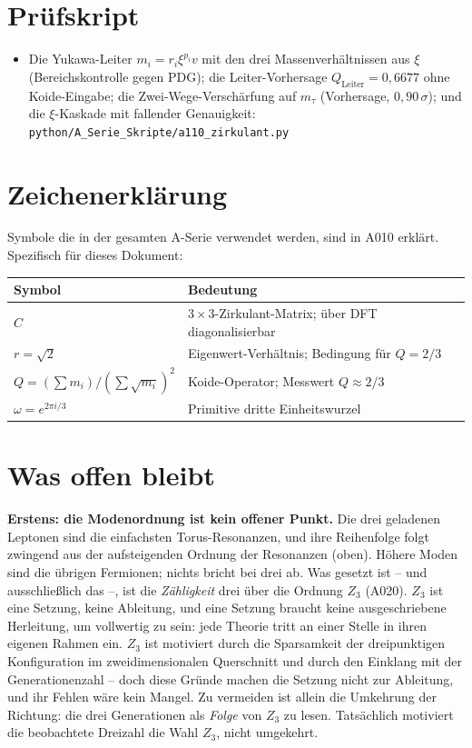 \section{Prüfskript}

\begin{itemize}
  \item Die Yukawa-Leiter $m_i = r_i\xi^{p_i}v$ mit den drei Massenverhältnissen
    aus $\xi$ (Bereichskontrolle gegen PDG); die Leiter-Vorhersage
    $Q_\text{Leiter}=0{,}6677$ ohne Koide-Eingabe; die Zwei-Wege-Verschärfung auf
    $m_\tau$ (Vorhersage, $0{,}90\,\sigma$); und die $\xi$-Kaskade mit fallender
    Genauigkeit:
    \texttt{python/A\_Serie\_Skripte/a110\_zirkulant.py}
\end{itemize}


\section{Zeichenerklärung}

Symbole die in der gesamten A-Serie verwendet werden, sind in A010 erklärt.
Spezifisch für dieses Dokument:

\begin{center}
\renewcommand{\arraystretch}{1.3}
{\small\begin{tabular}{lp{9cm}}
\toprule
Symbol & Bedeutung \\
\midrule
$C$ & $3\times3$-Zirkulant-Matrix; über DFT diagonalisierbar \\
$r=\sqrt{2}$ & Eigenwert-Verhältnis; Bedingung für $Q=2/3$ \\
$Q = (\sum m_i)/(\sum\sqrt{m_i})^2$ & Koide-Operator; Messwert $Q\approx2/3$ \\
$\omega = e^{2\pi i/3}$ & Primitive dritte Einheitswurzel \\
\bottomrule
\end{tabular}}
\renewcommand{\arraystretch}{1.0}
\end{center}

\section{Was offen bleibt}

\textbf{Erstens: die Modenordnung ist kein offener Punkt.} Die drei geladenen
Leptonen sind die einfachsten Torus-Resonanzen, und ihre Reihenfolge folgt
zwingend aus der aufsteigenden Ordnung der Resonanzen (oben). Höhere Moden sind
die übrigen Fermionen; nichts bricht bei drei ab. Was gesetzt ist -- und
ausschließlich das --, ist die \emph{Zähligkeit} drei über die Ordnung $Z_3$
(A020). $Z_3$ ist eine Setzung, keine Ableitung, und eine Setzung braucht keine
ausgeschriebene Herleitung, um vollwertig zu sein: jede Theorie tritt an einer
Stelle in ihren eigenen Rahmen ein. $Z_3$ ist motiviert durch die Sparsamkeit
der dreipunktigen Konfiguration im zweidimensionalen Querschnitt und durch den
Einklang mit der Generationenzahl -- doch diese Gründe machen die Setzung nicht
zur Ableitung, und ihr Fehlen wäre kein Mangel. Zu vermeiden ist allein die
Umkehrung der Richtung: die drei Generationen als \emph{Folge} von $Z_3$ zu
lesen. Tatsächlich motiviert die beobachtete Dreizahl die Wahl $Z_3$, nicht
umgekehrt.

